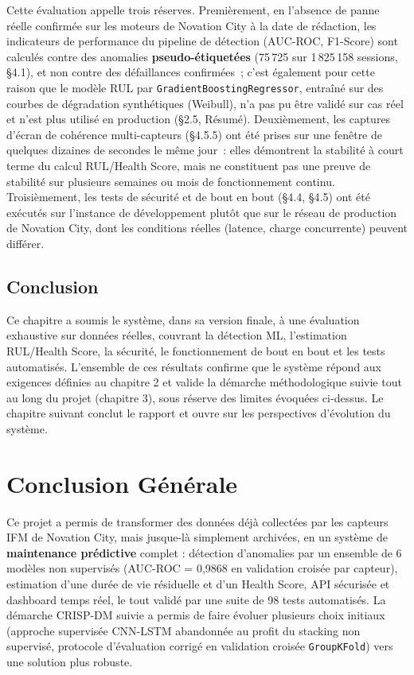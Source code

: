 \documentclass[12pt,a4paper]{report}
\begin{document}
Cette évaluation appelle trois réserves. Premièrement, en l'absence de panne réelle
confirmée sur les moteurs de Novation City à la date de rédaction, les indicateurs de
performance du pipeline de détection (AUC-ROC, F1-Score) sont calculés contre des
anomalies \textbf{pseudo-étiquetées} (75\,725 sur 1\,825\,158 sessions, \S4.1), et non
contre des défaillances confirmées~; c'est également pour cette raison que le modèle RUL
par \texttt{GradientBoostingRegressor}, entraîné sur des courbes de dégradation
synthétiques (Weibull), n'a pas pu être validé sur cas réel et n'est plus utilisé en
production (\S2.5, Résumé). Deuxièmement, les captures d'écran de cohérence multi-capteurs
(\S4.5.5) ont été prises sur une fenêtre de quelques dizaines de secondes le même jour~:
elles démontrent la stabilité à court terme du calcul RUL/Health Score, mais ne
constituent pas une preuve de stabilité sur plusieurs semaines ou mois de fonctionnement
continu. Troisièmement, les tests de sécurité et de bout en bout (\S4.4, \S4.5) ont été
exécutés sur l'instance de développement plutôt que sur le réseau de production de
Novation City, dont les conditions réelles (latence, charge concurrente) peuvent différer.

\section{Conclusion}

Ce chapitre a soumis le système, dans sa version finale, à une évaluation exhaustive sur
données réelles, couvrant la détection ML, l'estimation RUL/Health Score, la sécurité, le
fonctionnement de bout en bout et les tests automatisés. L'ensemble de ces résultats
confirme que le système répond aux exigences définies au chapitre 2 et valide la démarche
méthodologique suivie tout au long du projet (chapitre 3), sous réserve des limites
évoquées ci-dessus. Le chapitre suivant conclut le rapport et ouvre sur les perspectives
d'évolution du système.

\chapter*{Conclusion Générale}

Ce projet a permis de transformer des données déjà collectées par les capteurs IFM
de Novation City, mais jusque-là simplement archivées, en un système de
\textbf{maintenance prédictive} complet : détection d'anomalies par un ensemble de
6 modèles non supervisés (AUC-ROC = 0,9868 en validation croisée par capteur),
estimation d'une durée de vie résiduelle et d'un Health Score, API sécurisée et
dashboard temps réel, le tout validé par une suite de 98 tests automatisés. La
démarche CRISP-DM suivie a permis de faire évoluer plusieurs choix initiaux
(approche supervisée CNN-LSTM abandonnée au profit du stacking non supervisé,
protocole d'évaluation corrigé en validation croisée \texttt{GroupKFold}) vers une
solution plus robuste.
\end{document}
